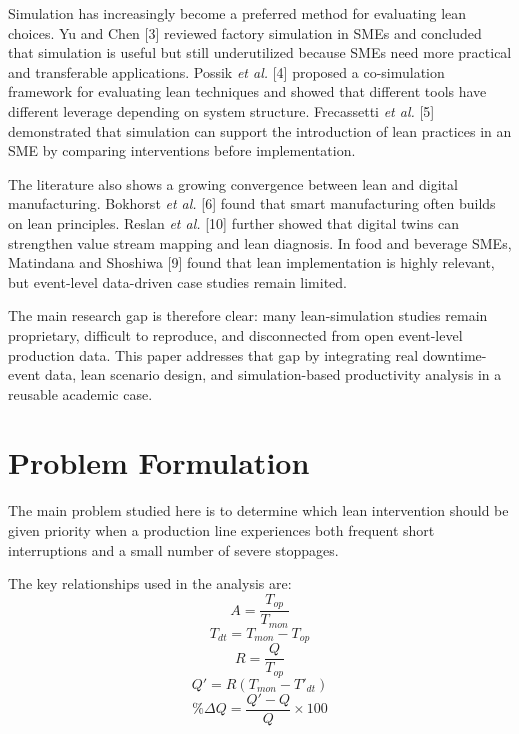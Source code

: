 \documentclass[12pt,a4paper]{article}
\begin{document}
Simulation has increasingly become a preferred method for evaluating lean choices. Yu and Chen [3] reviewed factory simulation in SMEs and concluded that simulation is useful but still underutilized because SMEs need more practical and transferable applications. Possik \emph{et al.} [4] proposed a co-simulation framework for evaluating lean techniques and showed that different tools have different leverage depending on system structure. Frecassetti \emph{et al.} [5] demonstrated that simulation can support the introduction of lean practices in an SME by comparing interventions before implementation.

The literature also shows a growing convergence between lean and digital manufacturing. Bokhorst \emph{et al.} [6] found that smart manufacturing often builds on lean principles. Reslan \emph{et al.} [10] further showed that digital twins can strengthen value stream mapping and lean diagnosis. In food and beverage SMEs, Matindana and Shoshiwa [9] found that lean implementation is highly relevant, but event-level data-driven case studies remain limited.

The main research gap is therefore clear: many lean-simulation studies remain proprietary, difficult to reproduce, and disconnected from open event-level production data. This paper addresses that gap by integrating real downtime-event data, lean scenario design, and simulation-based productivity analysis in a reusable academic case.

\section{Problem Formulation}
The main problem studied here is to determine which lean intervention should be given priority when a production line experiences both frequent short interruptions and a small number of severe stoppages.

The key relationships used in the analysis are:
\begin{equation}
A = \frac{T_{op}}{T_{mon}}
\end{equation}
\begin{equation}
T_{dt} = T_{mon} - T_{op}
\end{equation}
\begin{equation}
R = \frac{Q}{T_{op}}
\end{equation}
\begin{equation}
Q' = R(T_{mon} - T'_{dt})
\end{equation}
\begin{equation}
\%\Delta Q = \frac{Q' - Q}{Q}\times 100
\end{equation}
\end{document}
